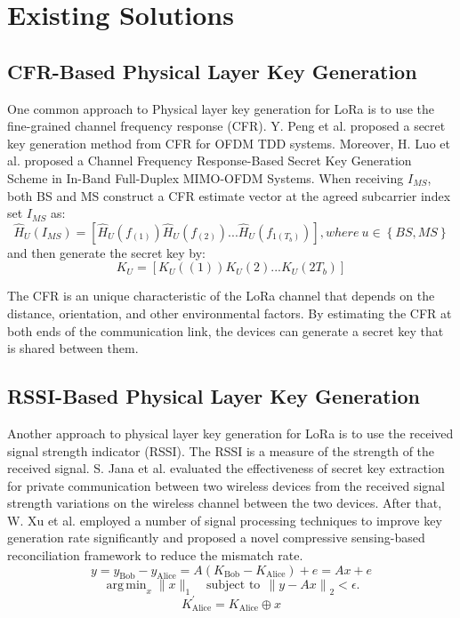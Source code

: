 \section{Existing Solutions}
\subsection{CFR-Based Physical Layer Key Generation}
One common approach to Physical layer key generation for LoRa is to use the fine-grained channel frequency response (CFR). Y. Peng et al. proposed a secret key generation method from CFR for OFDM TDD systems\cite{7054386}. Moreover, H. Luo et al. proposed a Channel Frequency Response-Based Secret Key Generation Scheme in In-Band Full-Duplex MIMO-OFDM Systems\cite{10158732}. When receiving \(I_{MS}\), both BS and MS construct a CFR estimate vector at the agreed subcarrier index set \(I_{MS}\) as:
\begin{equation} 
  \hat{H}_{U}(I_{MS})   = \left [ \hat{H}_{U}(f_{(1)})\hat{H}_{U}(f_{(2)}) ...\hat{H}_{U}(f_{1(T_{b})}) \right ], where\ u\in \left \{ BS, MS  \right \}   
\end{equation} 
and then generate the secret key by:
\begin{equation} 
  K_{U}  = \left [ K_{U}({(1)})K_{U}{(2)} ...K_{U}({2T_{b}}) \right ]
\end{equation} 

The CFR is an unique characteristic of the LoRa channel that depends on the distance, orientation, and other environmental factors. By estimating the CFR at both ends of the communication link, the devices can generate a secret key that is shared between them.

\subsection{RSSI-Based Physical Layer Key Generation}
Another approach to physical layer key generation for LoRa is to use the received signal strength indicator (RSSI). The RSSI is a measure of the strength of the received signal. S. Jana et al. evaluated the effectiveness of secret key extraction for private communication between two wireless devices from the received signal strength variations on the wireless channel between the two devices\cite{10.1145/1614320.1614356}. After that, W. Xu et al. employed a number of signal processing techniques to improve key generation rate significantly and proposed a novel compressive sensing-based reconciliation framework to reduce the mismatch rate\cite{8580375}. 
\begin{equation} y = y_{\mathrm{ Bob}}-y_{\mathrm{ Alice}}= A \left ({K_{\mathrm{ Bob}}-K_{\mathrm{ Alice}}}\right) + e= A x +e \end{equation} 
\begin{equation} \mathop {\mathrm {arg\,min}} _{x} \| x \|_{1} \quad \text {subject to}~ ~\left \|{y - Ax}\right \|_{2} < \epsilon.\end{equation} 
\begin{equation}K_{\mathrm{ Alice}}^{'} = K_{\mathrm{ Alice}} \oplus x\end{equation} 

